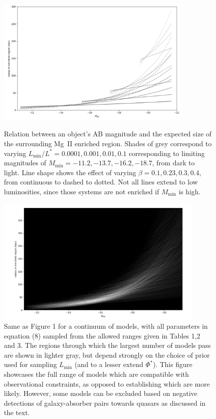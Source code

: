 \documentclass[useAMS,usenatbib]{mn2e}
\newcommand{\magtwo}{Mg~{\small II} }
\begin{document}
\begin{figure}
\includegraphics[width=0.85\textwidth]{plots/MgII_few.png}
\caption{Relation between an object's AB magnitude and the expected size of the surrounding \magtwo enriched region. Shades of grey correspond to varying $L_\text{min}/L^*=0.0001,0.001,0.01,0.1$ corresponding to limiting magnitudes of $M_\text{min} = -11.2, -13.7, -16.2, -18.7$, from dark to light. Line shape shows the effect of varying $\beta=0.1,0.23,0.3,0.4$, from continuous to dashed to dotted. Not all lines extend to low luminosities, since those systems are not  enriched if $M_\text{min}$ is high.}
\includegraphics[width=0.9\textwidth]{plots/MgII_range.png}
\caption{Same as Figure 1 for a continuum of models, with all parameters in equation (8) sampled from the allowed ranges given in Tables 1,2 and 3. The regions through which the largest number of models pass are shown in lighter gray, but depend strongly on the choice of prior used for sampling $L_\text{min}$ (and to a lesser extend $\Phi^*$). This figure showcases the full range of models which are compatible with observational constraints, as opposed to establishing which are more likely. However, some models can be excluded based on negative detections of galaxy-absorber pairs towards quasars as discussed in the text.}
\end{figure}
\end{document}
